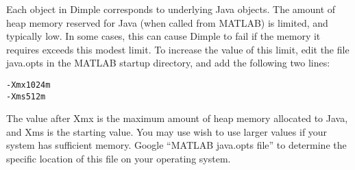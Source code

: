 Each object in Dimple corresponds to underlying Java objects. The amount of heap memory reserved for Java (when called from MATLAB) is limited, and typically low.  In some cases, this can cause Dimple to fail if the memory it requires exceeds this modest limit.  To increase the value of this limit, edit the file java.opts in the MATLAB startup directory, and add the following two lines:

\begin{lstlisting}
-Xmx1024m
-Xms512m
\end{lstlisting}

The value after Xmx is the maximum amount of heap memory allocated to Java, and Xms is the starting value.  You may use wish to use larger values if your system has sufficient memory.  Google ``MATLAB java.opts file'' to determine the specific location of this file on your operating system.
